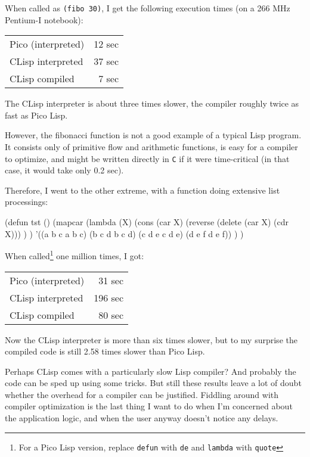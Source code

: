When called as \texttt{(fibo 30)}, I get the following execution times (on a 266
MHz Pentium-I notebook):

\vspace{4pt}
\begin{tabular}[c]{lr}
   Pico (interpreted) & 12 sec \\
   CLisp interpreted  & 37 sec \\
   CLisp compiled     &  7 sec \\
\end{tabular}
\vspace{4pt}

The CLisp interpreter is about three times slower, the compiler roughly twice as
fast as Pico Lisp.

However, the fibonacci function is not a good example of a typical Lisp program.
It consists only of primitive flow and arithmetic functions, is easy for a
compiler to optimize, and might be written directly in \texttt{C} if it were
time-critical (in that case, it would take only 0.2 sec).

Therefore, I went to the other extreme, with a function doing extensive list
processings:

\begin{wideverbatim}
(defun tst ()
   (mapcar
      (lambda (X)
         (cons
            (car X)
            (reverse (delete (car X) (cdr X))) ) )
      '((a b c a b c) (b c d b c d) (c d e c d e) (d e f d e f)) ) )
\end{wideverbatim}

When called\footnote{For a Pico Lisp version, replace \texttt{defun} with
\texttt{de} and \texttt{lambda} with \texttt{quote}} one million times, I got:

\vspace{4pt}
\begin{tabular}[c]{lr}
   Pico (interpreted) &  31 sec \\
   CLisp interpreted  & 196 sec \\
   CLisp compiled     &  80 sec \\
\end{tabular}
\vspace{4pt}

Now the CLisp interpreter is more than six times slower, but to my surprise the
compiled code is still 2.58 times slower than Pico Lisp.

Perhaps CLisp comes with a particularly slow Lisp compiler? And probably the
code can be sped up using some tricks. But still these results leave a lot of
doubt whether the overhead for a compiler can be justified. Fiddling around with
compiler optimization is the last thing I want to do when I'm concerned about
the application logic, and when the user anyway doesn't notice any delays.


